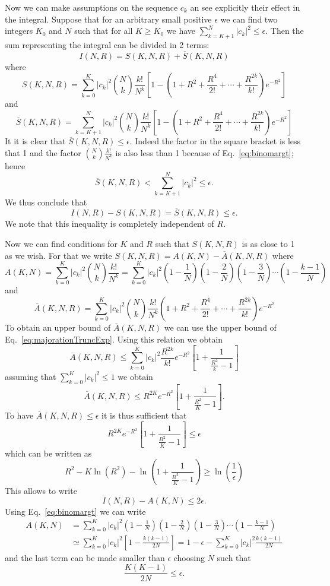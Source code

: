 \documentclass[aps,prl,showpacs,twocolumn]{revtex4-2}
\providecommand{\abs}[1]{\left\lvert#1\right\rvert}
\providecommand{\abs}[1]{\left\lvert#1\right\rvert}
\providecommand{\abs}[1]{\left\lvert#1\right\rvert}
\providecommand{\abs}[1]{\left\lvert#1\right\rvert}
\begin{document}
Now we can make assumptions on the sequence $c_k$ an see explicitly  their effect in the integral. Suppose that for an arbitrary small positive $\epsilon$ we can find two integers  $K_0$ and $N$ such that for all $K\ge K_0$ we have
$\sum_{k=K+1}^N \abs{c_k}^2\leq \epsilon$.
Then the sum representing the integral can be divided in 2 terms:
\[
I(N,R) = S(K,N,R) + \overline{S}(K,N,R)
\]
where
\[
S(K,N,R) = \sum_{k=0}^K \abs{c_k}^2\binom{N}{k}\frac{k!}{N^k} \left[1 -\left(1+R^2+\frac{R^4}{2!} +  \cdots +  \frac{R^{2k}}{k!} \right) e^{-R^2} \right]
\]
and
\[
\overline{S}(K,N,R) =  \sum_{k=K+1}^N \abs{c_k}^2\binom{N}{k}\frac{k!}{N^k} \left[1 -\left(1+R^2+\frac{R^4}{2!} +  \cdots +  \frac{R^{2k}}{k!} \right) e^{-R^2} \right]
\]
It it is clear that $\overline{S}(K,N,R)  \leq \epsilon$.
Indeed the factor in the square bracket is less that 1 and the factor $\binom{N}{k}\frac{k!}{N^k}$ is also less than 1 because of Eq.~\eqref{eq:binomargt};
hence
\[
\overline{S}(K,N,R) < \sum_{k=K+1}^N \abs{c_k}^2 \leq \epsilon.
\]
We thus conclude that
\[
I(N,R) - S(K,N,R) = \overline{S}(K,N,R) \leq \epsilon.
\]
We note that this inequality is completely independent of $R$.

Now we can find conditions for $K$ and $R$ such that $S(K,N,R)$ is as close to 1 as we wish.
For that we write
$S(K,N,R) = A(K,N) - \overline{A}(K,N,R)$
where
\[
A(K,N) = \sum_{k=0}^K \abs{c_k}^2\binom{N}{k}\frac{k!}{N^k} =
\sum_{k=0}^K \abs{c_k}^2 \left(1-\frac{1}{N}\right)\left(1-\frac{2}{N}\right)\left(1-\frac{3}{N}\right)\cdots \left(1-\frac{k-1}{N}\right)
\]
and
\[
\overline{A}(K,N,R) = \sum_{k=0}^K \abs{c_k}^2\binom{N}{k}\frac{k!}{N^k}
\left(1+R^2+\frac{R^4}{2!} +  \cdots +  \frac{R^{2k}}{k!} \right) e^{-R^2}
\]
To obtain an upper bound of $\overline{A}(K,N,R)$ we can use the upper bound of Eq.~\eqref{eq:majorationTruncExp}.
Using this relation we obtain
\[
\overline{A}(K,N,R) \leq
\sum_{k=0}^{K} \abs{c_k}^2 \frac{R^{2k}}{k!}e^{-R^2}
\left[
1 + \frac{1}{\frac{R^2}{k}-1}
\right]
\]
assuming that $\sum_{k=0}^K \abs{c_k}^2\leq 1$ we obtain
\[
\overline{A}(K,N,R)\leq  R^{2K}e^{-R^2}
\left[
1 + \frac{1}{\frac{R^2}{K}-1}
\right].
\]
To have  $\overline{A}(K,N,R)\leq \epsilon$ it is thus sufficient that
\[
R^{2K}e^{-R^2}
\left[
1 + \frac{1}{\frac{R^2}{K}-1}\right]
\leq \epsilon
\]
which can be written as
\[
R^2 - K\ln(R^2) -\ln(1 + \frac{1}{\frac{R^2}{K}-1}) \geq \ln{\left (\frac{1}{\epsilon}\right )}
\]
This allows to write
\[
I(N,R) - A(K,N) \leq 2\epsilon.
\]
Using Eq.~\eqref{eq:binomargt} we can write
\begin{align*}
	A(K,N) &=
	\sum_{k=0}^K \abs{c_k}^2 \left(1-\frac{1}{N}\right)\left(1-\frac{2}{N}\right)\left(1-\frac{3}{N}\right)\cdots \left(1-\frac{k-1}{N}\right) \\
	&\simeq
	\sum_{k=0}^K \abs{c_k}^2 \left[1 - \frac{k(k-1)}{2N}\right] = 1-\epsilon - \sum_{k=0}^K \abs{c_k}^2\frac{k(k-1)}{2N}
\end{align*}
and the last term can be made smaller than $\epsilon$ choosing $N$ such that
\[
\frac{K(K-1)}{2N} \leq \epsilon.
\]
\end{document}
